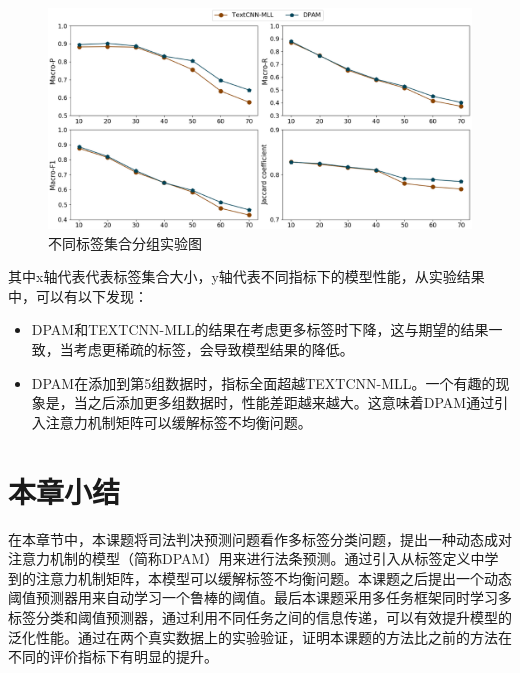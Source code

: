 \begin{figure}[htbp]%
\centering
\includegraphics[scale=0.30, clip=true]{./sources/dpam_comL.eps}
\caption{\label{fig:comL}不同标签集合分组实验图}
\end{figure}

其中x轴代表代表标签集合大小，y轴代表不同指标下的模型性能，从实验结果中，可以有以下发现：
\begin{itemize}
    \item DPAM和TEXTCNN-MLL的结果在考虑更多标签时下降，这与期望的结果一致，当考虑更稀疏的标签，会导致模型结果的降低。
    \item DPAM在添加到第5组数据时，指标全面超越TEXTCNN-MLL。一个有趣的现象是，当之后添加更多组数据时，性能差距越来越大。这意味着DPAM通过引入注意力机制矩阵可以缓解标签不均衡问题。
\end{itemize}

\section{本章小结}
\label{sec:dpam_conclu}
在本章节中，本课题将司法判决预测问题看作多标签分类问题，提出一种动态成对注意力机制的模型（简称DPAM）用来进行法条预测。通过引入从标签定义中学到的注意力机制矩阵，本模型可以缓解标签不均衡问题。本课题之后提出一个动态阈值预测器用来自动学习一个鲁棒的阈值。最后本课题采用多任务框架同时学习多标签分类和阈值预测器，通过利用不同任务之间的信息传递，可以有效提升模型的泛化性能。通过在两个真实数据上的实验验证，证明本课题的方法比之前的方法在不同的评价指标下有明显的提升。
